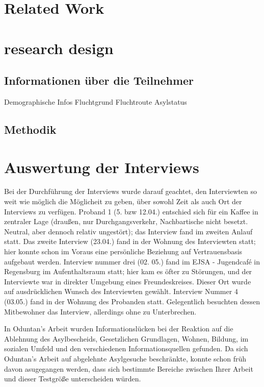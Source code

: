 \documentclass[12pt,oneside]{article}
\begin{document}
\section{Related Work}


\section{research design}

\subsection{Informationen über die Teilnehmer}

Demographische Infos
Fluchtgrund
Fluchtroute
Asylstatus

\subsection{Methodik}

\section{Auswertung der Interviews}

Bei der Durchführung der Interviews wurde darauf geachtet, den Interviewten so weit wie möglich die Möglicheit zu geben, über sowohl Zeit als auch Ort der Interviews zu verfügen. Proband 1 (5. bzw 12.04.) entschied sich für ein Kaffee in zentraler Lage (draußen, nur Durchgangsverkehr, Nachbartische nicht besetzt. Neutral, aber dennoch relativ ungestört); das Interview fand im zweiten Anlauf statt.\newline
Das zweite Interview (23.04.) fand in der Wohnung des Interviewten statt; hier konnte schon im Voraus eine persönliche Beziehung auf Vertrauensbasis aufgebaut werden.
Interview nummer drei (02. 05.) fand im EJSA - Jugendcafé in Regensburg im Aufenthaltsraum statt; hier kam es öfter zu Störungen, und der Interviewte war in direkter Umgebung eines Freundeskreises. Dieser Ort wurde auf ausdrücklichen Wunsch des Interviewten gewählt.
Interview Nummer 4 (03.05.) fand in der Wohnung des Probanden statt. Gelegentlich besuchten dessen Mitbewohner das Interview, allerdings ohne zu Unterbrechen. 

In Oduntan's Arbeit wurden Informationslücken bei der Reaktion auf die Ablehnung des Asylbescheids, Gesetzlichen Grundlagen, Wohnen, Bildung, im sozialen Umfeld und den verschiedenen Informationsquellen gefunden.\newline
Da sich Oduntan's Arbeit auf abgelehnte Asylgesuche beschränkte, konnte schon früh davon asugegangen werden, dass sich bestimmte Bereiche zwischen Ihrer Arbeit und dieser Testgröße unterscheiden würden.
\end{document}
